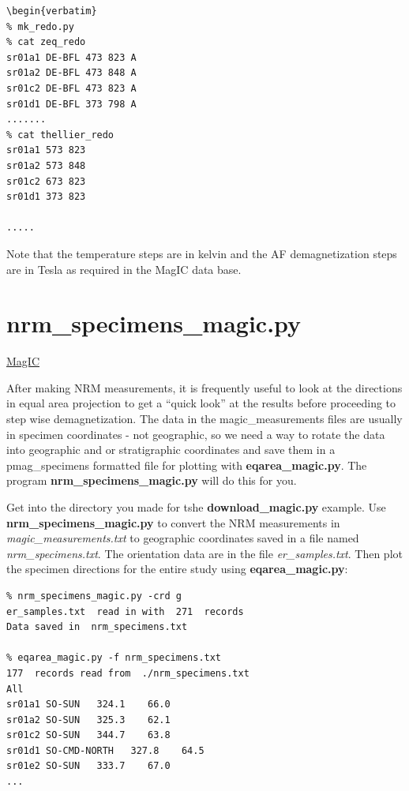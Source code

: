 \documentclass[11pt]{book}
\begin{document}
{{\begin{verbatim}
\begin{verbatim}
% mk_redo.py
% cat zeq_redo
sr01a1 DE-BFL 473 823 A 
sr01a2 DE-BFL 473 848 A 
sr01c2 DE-BFL 473 823 A 
sr01d1 DE-BFL 373 798 A 
.......
% cat thellier_redo
sr01a1 573 823 
sr01a2 573 848 
sr01c2 673 823 
sr01d1 373 823 

.....
\end{verbatim}

\noindent Note that the temperature steps are in kelvin and the AF demagnetization steps are in Tesla as required in the MagIC data base.    



%

\section {\bf nrm\_specimens\_magic.py} 
\href{#MagIC}{MagIC}

After making NRM measurements, it is frequently useful to look at the directions in equal area projection to get a ``quick look'' at the results before proceeding to step wise demagnetization.  The data in the magic\_measurements files are usually in specimen coordinates - not geographic, so we need a way to rotate the data into geographic and or stratigraphic coordinates and save them in a pmag\_specimens formatted file for plotting with {\bf eqarea\_magic.py}.   The program {\bf nrm\_specimens\_magic.py} will do this for you.  

Get into the directory you made for tshe {\bf download\_magic.py} example.   Use {\bf nrm\_specimens\_magic.py} to convert the NRM measurements in  {\it magic\_measurements.txt }   to geographic coordinates saved in a file named {\it nrm\_specimens.txt}.  The orientation data are in the file {\it er\_samples.txt}.    Then plot the specimen directions for the entire study using {\bf eqarea\_magic.py}:
 
 
 \begin{verbatim}
% nrm_specimens_magic.py -crd g
er_samples.txt  read in with  271  records
Data saved in  nrm_specimens.txt

% eqarea_magic.py -f nrm_specimens.txt
177  records read from  ./nrm_specimens.txt
All
sr01a1 SO-SUN   324.1    66.0
sr01a2 SO-SUN   325.3    62.1
sr01c2 SO-SUN   344.7    63.8
sr01d1 SO-CMD-NORTH   327.8    64.5
sr01e2 SO-SUN   333.7    67.0
...

 \end{verbatim}
 
}}
\end{document}
